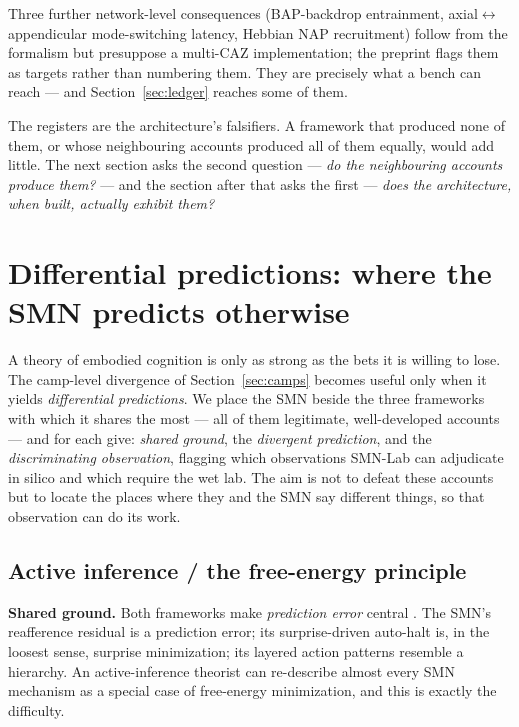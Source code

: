 \documentclass[utf8]{FrontiersinHarvard} %
\begin{document}
Three further network-level consequences (BAP-backdrop entrainment, axial$\leftrightarrow$appendicular mode-switching latency, Hebbian NAP recruitment) follow from the formalism but presuppose a multi-CAZ implementation; the preprint flags them as targets rather than numbering them. They are precisely what a bench can reach --- and Section~\ref{sec:ledger} reaches some of them.

The registers are the architecture's falsifiers. A framework that produced none of them, or whose neighbouring accounts produced all of them equally, would add little. The next section asks the second question --- \emph{do the neighbouring accounts produce them?} --- and the section after that asks the first --- \emph{does the architecture, when built, actually exhibit them?}

\section{Differential predictions: where the SMN predicts otherwise}\label{sec:falsify}

A theory of embodied cognition is only as strong as the bets it is willing to lose. The camp-level divergence of Section~\ref{sec:camps} becomes useful only when it yields \emph{differential predictions}. We place the SMN beside the three frameworks with which it shares the most --- all of them legitimate, well-developed accounts --- and for each give: \emph{shared ground}, the \emph{divergent prediction}, and the \emph{discriminating observation}, flagging which observations SMN-Lab can adjudicate in silico and which require the wet lab. The aim is not to defeat these accounts but to locate the places where they and the SMN say different things, so that observation can do its work.

\subsection{Active inference / the free-energy principle}\label{sec:fep}
\textbf{Shared ground.} Both frameworks make \emph{prediction error} central \citep{Friston2010FreeEnergyPrinciple,ParrPezzuloFriston2022}. The SMN's reafference residual is a prediction error; its surprise-driven auto-halt is, in the loosest sense, surprise minimization; its layered action patterns resemble a hierarchy. An active-inference theorist can re-describe almost every SMN mechanism as a special case of free-energy minimization, and this is exactly the difficulty.
\end{document}
